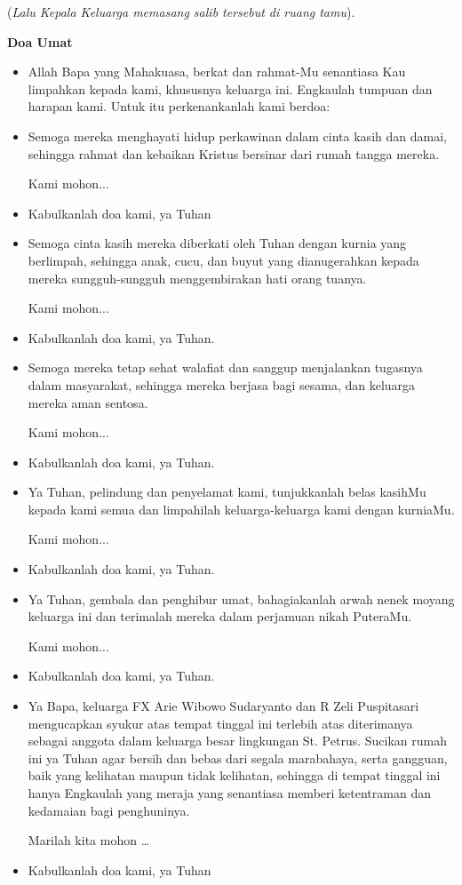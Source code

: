 \documentclass[12pt,twoside,anypage]{scrbook}
\makeatletter
\newcommand{\subjudul}[1]{%
  {\parindent \z@ \normalfont
    \interlinepenalty\@M \bfseries #1\par\nobreak \vskip 20\p@ }}
\newcommand{\BU}[1]{\begin{itemize} \item[U:] #1 \end{itemize}}
\newcommand{\BI}[1]{\begin{itemize} \item[I:] #1 \end{itemize}}
\newcommand{\BP}[1]{\begin{itemize} \item[P:] #1 \end{itemize}}
\newcommand{\keluarga}{FX Arie Wibowo Sudaryanto dan R Zeli Puspitasari\xspace}
\makeatother
\begin{document}
(\textit{Lalu Kepala Keluarga memasang salib tersebut di ruang tamu}).

\subjudul{Doa Umat}
\BI{Allah Bapa yang Mahakuasa, berkat dan rahmat-Mu senantiasa Kau limpahkan kepada kami, khususnya keluarga ini. Engkaulah tumpuan dan harapan kami. Untuk itu perkenankanlah kami berdoa:}

\BP{Semoga mereka menghayati hidup perkawinan dalam cinta kasih dan damai, sehingga rahmat dan kebaikan Kristus bersinar dari rumah tangga mereka. 

Kami mohon...}

\BU{Kabulkanlah doa kami, ya Tuhan}

\BP{Semoga cinta kasih mereka diberkati oleh Tuhan dengan kurnia yang berlimpah, sehingga anak, cucu, dan buyut yang dianugerahkan kepada mereka sungguh-sungguh menggembirakan hati orang tuanya.

Kami mohon...}

\BU{Kabulkanlah doa kami, ya Tuhan.}

\BP{Semoga mereka tetap sehat walafiat dan sanggup menjalankan tugasnya dalam masyarakat, sehingga mereka berjasa bagi sesama, dan keluarga mereka aman sentosa. 

Kami mohon...}

\BU{Kabulkanlah doa kami, ya Tuhan.}

\BP{Ya Tuhan, pelindung dan penyelamat kami, tunjukkanlah belas kasihMu kepada kami semua dan limpahilah keluarga-keluarga kami dengan kurniaMu.

Kami mohon...}

\BU{Kabulkanlah doa kami, ya Tuhan.}

\BP{Ya Tuhan, gembala dan penghibur umat, bahagiakanlah arwah nenek moyang keluarga ini dan terimalah mereka dalam perjamuan nikah PuteraMu.

Kami mohon...}

\BU{Kabulkanlah doa kami, ya Tuhan.}

\BP{Ya Bapa, keluarga \keluarga mengucapkan syukur atas tempat tinggal ini terlebih atas diterimanya sebagai anggota dalam keluarga besar lingkungan St. Petrus. Sucikan rumah ini ya Tuhan agar bersih dan bebas dari segala marabahaya, serta gangguan, baik yang kelihatan maupun tidak kelihatan, sehingga di tempat tinggal ini hanya Engkaulah yang meraja yang senantiasa memberi ketentraman dan kedamaian bagi penghuninya.  

Marilah kita mohon \ldots}

\BU{Kabulkanlah doa kami, ya Tuhan}
\end{document}
